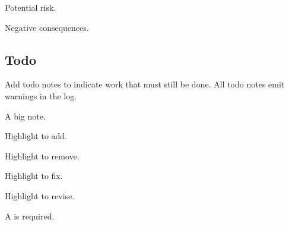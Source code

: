 \documentclass[11pt,titlepage]{article}
\begin{document}
\begin{example}
\begin{caution}
  Potential risk.
\end{caution}
\end{example}

\begin{example}
\begin{danger}
  Negative consequences.
\end{danger}
\end{example}


\subsection{Todo}

\makeatletter
\let\old@stz@warning\@stz@warning
\let\@stz@warning\@gobble
\makeatother

Add todo notes to indicate work that must still be done.
All todo notes emit warnings in the log.

\begin{example}
\begin{todo}
  A big note.
\end{todo}
\end{example}

\begin{example}
Highlight  to add.
\todoadd{}
\end{example}

\begin{example}
Highlight  to remove.
\todoremove{}
\end{example}

\begin{example}
Highlight  to fix.
\todofix{}
\end{example}

\begin{example}
Highlight  to revise.
\todorevise{}
\end{example}

\begin{example}
A  is required.
\todocite{}
\end{example}
\end{document}

